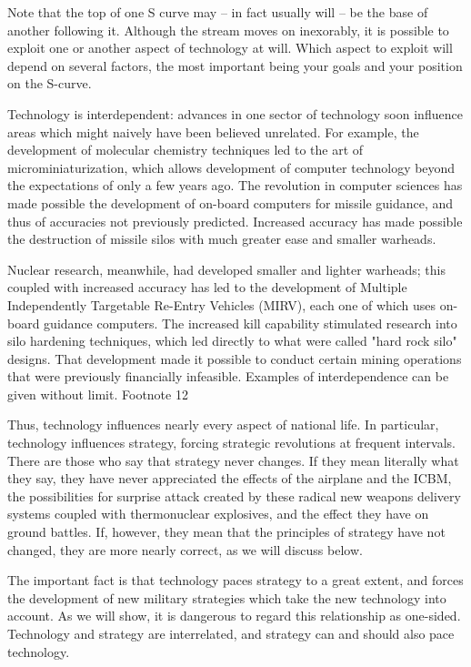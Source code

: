 \documentclass[a4paper,12pt]{book}
\begin{document}
Note that the top of one S curve may -- in fact usually will -- be the base of another following it. Although the stream moves on inexorably, it is possible to exploit one or another aspect of technology at will. Which aspect to exploit will depend on several factors, the most important being your goals and your position on the S-curve.

Technology is interdependent: advances in one sector of technology soon influence areas which might naively have been believed unrelated. For example, the development of molecular chemistry techniques led to the art of microminiaturization, which allows development of computer technology beyond the expectations of only a few years ago. The revolution in computer sciences has made possible the development of on-board computers for missile guidance, and thus of accuracies not previously predicted. Increased accuracy has made possible the destruction of missile silos with much greater ease and smaller warheads.

Nuclear research, meanwhile, had developed smaller and lighter warheads; this coupled with increased accuracy has led to the development of Multiple Independently Targetable Re-Entry Vehicles (MIRV), each one of which uses on-board guidance computers. The increased kill capability stimulated research into silo hardening techniques, which led directly to what were called "hard rock silo" designs. That development made it possible to conduct certain mining operations that were previously financially infeasible. Examples of interdependence can be given without limit. Footnote 12

Thus, technology influences nearly every aspect of national life. In particular, technology influences strategy, forcing strategic revolutions at frequent intervals. There are those who say that strategy never changes. If they mean literally what they say, they have never appreciated the effects of the airplane and the ICBM, the possibilities for surprise attack created by these radical new weapons delivery systems coupled with thermonuclear explosives, and the effect they have on ground battles. If, however, they mean that the principles of strategy have not changed, they are more nearly correct, as we will discuss below.

The important fact is that technology paces strategy to a great extent, and forces the development of new military strategies which take the new technology into account. As we will show, it is dangerous to regard this relationship as one-sided. Technology and strategy are interrelated, and strategy can and should also pace technology.
\end{document}
